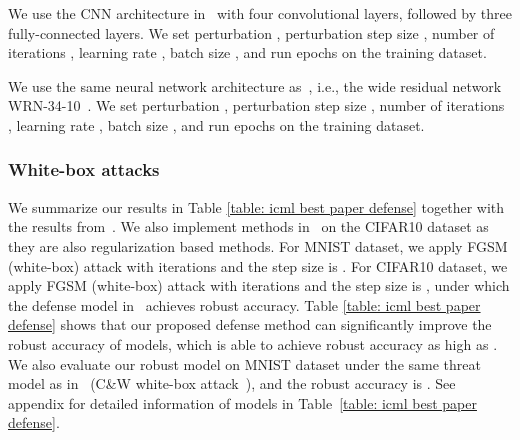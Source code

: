 \documentclass[11pt]{article}
\newcommand{\0}{\mathbf{0}}
\newcommand{\1}{\mathbf{1}}
\begin{document}
\medskip
{} We use the CNN architecture in~\cite{carlini2017towards} with four convolutional layers, followed by three fully-connected layers. We set perturbation , perturbation step size , number of iterations , learning rate , batch size , and run  epochs on the training dataset. 

\medskip
{} We use the same neural network architecture as~\cite{madry2018towards}, i.e., the wide residual network WRN-34-10~\cite{zagoruyko2016wide}. We set perturbation , perturbation step size , number of iterations , learning rate , batch size , and run  epochs on the training dataset. 

\vspace{-0.2cm}
\subsubsection{White-box attacks}\label{subsec:white-box}
\vspace{-0.2cm}
We summarize our results in Table \ref{table: icml best paper defense} together with the results from~\cite{athalye2018obfuscated}. We also implement methods in~\cite{zheng2016improving,kurakin2016adversarial,ross2017improving} on the CIFAR10 dataset as they are also regularization based methods. For MNIST dataset, we apply FGSM (white-box) attack with  iterations and the step size is . For CIFAR10 dataset, we apply FGSM (white-box) attack with  iterations and the step size is , under which the defense model in~\cite{madry2018towards} achieves  robust accuracy. Table \ref{table: icml best paper defense} shows that our proposed defense method can significantly improve the robust accuracy of models, which is able to achieve robust accuracy as high as . We also evaluate our robust model on MNIST dataset under the same threat model as in~\cite{samangouei2018defense} (C\&W white-box attack~\cite{carlini2017towards}), and the robust accuracy is . See appendix for detailed information of models in Table~\ref{table: icml best paper defense}.
\end{document}
